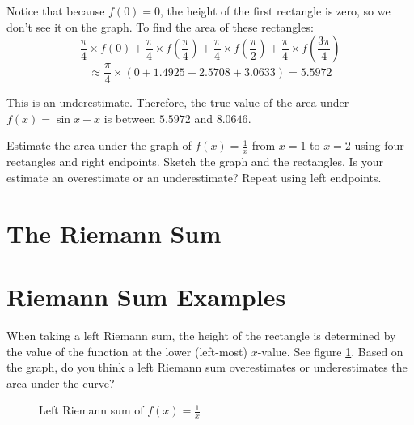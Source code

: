 Notice that because $f(0)=0$, the height of the first rectangle is zero, so we don't see it on the graph. To find the area of these rectangles:
$$\frac{\pi}{4} \times f(0) + \frac{\pi}{4} \times f(\frac{\pi}{4}) + \frac{\pi}{4} \times f(\frac{\pi}{2}) + \frac{\pi}{4} \times f(\frac{3\pi}{4})$$
$$\approx \frac{\pi}{4} \times (0 + 1.4925 + 2.5708 + 3.0633)=5.5972$$

This is an underestimate. Therefore, the true value of the area under $f(x) = \sin{x} +x$ is between $5.5972$ and $8.0646$. 

\begin{Exercise}[label=rsum1]
	Estimate the area under the graph of $f(x) = \frac{1}{x}$ from $x=1$ to $x=2$ using four rectangles and right endpoints. Sketch the graph and the rectangles. Is your estimate an overestimate or an underestimate? Repeat using left endpoints. 
	\vspace{100mm}
\end{Exercise}

\begin{Answer}[ref=rsum1]

\end{Answer}

\section{The Riemann Sum}
\section{Riemann Sum Examples}

When taking a left Riemann sum, the height of the rectangle is determined by the value of the function at the lower (left-most) $x$-value. See figure \ref{fig:leftriemann}. Based on the graph, do you think a left Riemann sum overestimates or underestimates the area under the curve?


\begin{figure}
    \centering
    \caption{Left Riemann sum of $f(x)=\frac{1}{x}$}
    \label{fig:leftriemann}
\end{figure}

